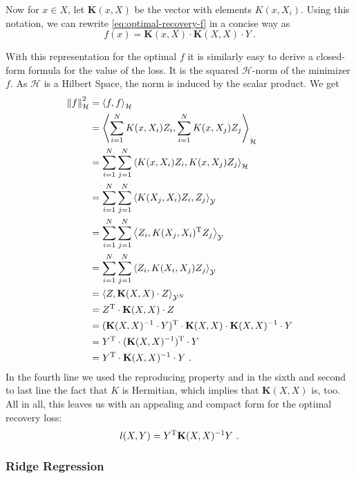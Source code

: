 Now for $x \in X$, let $\mathbf{K}(x, X)$ be the vector with elements $K(x, X_i)$.
Using this notation, we can rewrite \cref{eq:optimal-recovery-f} in a concise way as
\begin{equation}
	f(x) = \mathbf{K}(x, X) \cdot \mathbf{K}(X, X) \cdot Y \ .
\end{equation}

With this representation for the optimal $f$ it is similarly easy to derive a closed-form formula for the value of the loss.
It is the squared $\mathcal{H}$-norm of the minimizer $f$.
As $\mathcal{H}$ is a Hilbert Space, the norm is induced by the scalar product.
We get
\begin{align}
	\norm{f}_\mathcal{H}^2 &= \left< f, f\right>_\mathcal{H}\\
	&= \left< \sum_{i=1}^N K(x, X_i) Z_i, \sum_{i=1}^N K(x, X_j) Z_j \right>_\mathcal{H}\\
	&= \sum_{i=1}^N \sum_{j=1}^N \left< K(x, X_i) Z_i, K(x, X_j) Z_j \right>_\mathcal{H}\\
	&= \sum_{i=1}^N \sum_{j=1}^N \left< K(X_j, X_i)Z_i, Z_j \right>_{\mathcal{Y}}\\
	&= \sum_{i=1}^N \sum_{j=1}^N \left< Z_i, K(X_j, X_i)^{\mathrm{T}} Z_j \right>_{\mathcal{Y}}\\
	&= \sum_{i=1}^N \sum_{j=1}^N \left< Z_i, K(X_i, X_j) Z_j \right>_{\mathcal{Y}}\\
	&= \left< Z, \mathbf{K}(X, X) \cdot Z\right >_{\mathcal{Y}^N}\\
	&= Z^{\mathrm{T}} \cdot \mathbf{K}(X, X) \cdot Z \\
	&= (\mathbf{K}(X, X)^{-1} \cdot Y)^{\mathrm{T}} \cdot \mathbf{K}(X, X) \cdot \mathbf{K}(X, X)^{-1} \cdot Y\\
	&= Y^{\mathrm{T}} \cdot (\mathbf{K}(X, X)^{-1})^{\mathrm{T}} \cdot Y\\
	&=  Y^{\mathrm{T}} \cdot \mathbf{K}(X, X)^{-1} \cdot Y \ .
\end{align}
In the fourth line we used the reproducing property and in the sixth and second to last line the fact that $K$ is Hermitian, which implies that $\mathbf{K}(X, X)$ is, too.
All in all, this leaves us with an appealing and compact form for the optimal recovery loss:
\begin{equation}
	\label{eq:optimal-recovery-loss-closed-form}
	l(X, Y) = Y^{\mathrm{T}} \mathbf{K}(X, X)^{-1} Y \ .
\end{equation}

\subsubsection{Ridge Regression}

